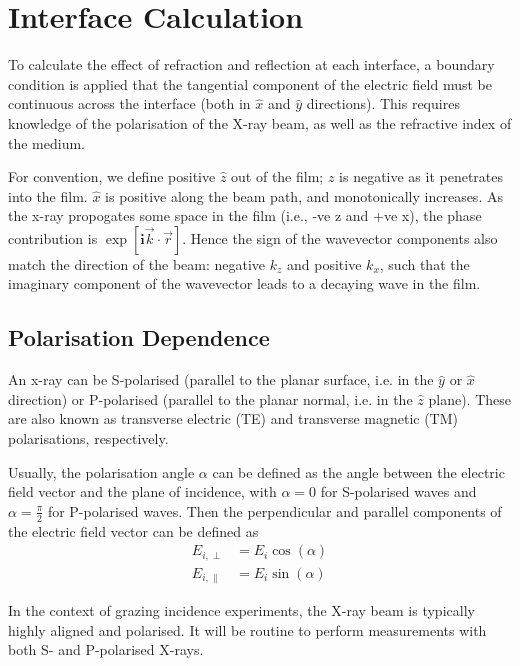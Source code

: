\documentclass[../main.tex]{subfiles}
\begin{document}
	\section{Interface Calculation}
	To calculate the effect of refraction and reflection at each interface, a boundary condition is applied that the tangential component of the electric field must be continuous across the interface (both in $\hat{x}$ and $\hat{y}$ directions). This requires knowledge of the polarisation of the X-ray beam, as well as the refractive index of the medium.

	For convention, we define positive $\hat{z}$ out of the film; $z$ is negative as it penetrates into the film. $\hat{x}$ is positive along the beam path, and monotonically increases. As the x-ray propogates some space in the film (i.e., -ve z and +ve x), the phase contribution is $\exp\left[\mathbf{i}\vec{k}\cdot\vec{r}\right]$.
	Hence the sign of the wavevector components also match the direction of the beam: negative $k_z$ and positive $k_x$, such that the imaginary component of the wavevector leads to a decaying wave in the film.

	\subsection{Polarisation Dependence}
	An x-ray can be S-polarised (parallel to the planar surface, i.e. in the $\hat{y}$ or $\hat{x}$ direction) or P-polarised (parallel to the planar normal, i.e. in the $\hat{z}$ plane). These are also known as transverse electric (TE) and transverse magnetic (TM) polarisations, respectively.

	Usually, the polarisation angle $\alpha$ can be defined as the angle between the electric field vector and the plane of incidence, with $\alpha = 0$ for S-polarised waves and $\alpha = \frac{\pi}{2}$ for P-polarised waves. Then the perpendicular and parallel components of the electric field vector can be defined as
	\begin{align}
		E_{i, \perp} &= E_i \cos(\alpha) \\
		E_{i, \parallel} &= E_i \sin(\alpha)
	\end{align}

	In the context of grazing incidence experiments, the X-ray beam is typically highly aligned and polarised. It will be routine to perform measurements with both S- and P-polarised X-rays.
\end{document}
